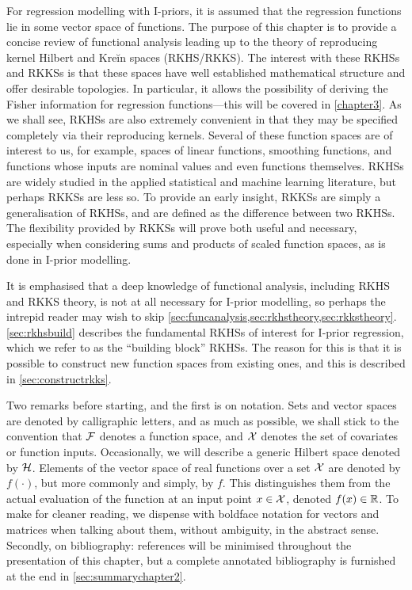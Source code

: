 \documentclass[showframe,11pt,twoside,openright]{report}
\begin{document}
\label{chapter2}
\thispagestyle{chaptertwo}

For regression modelling with I-priors, it is assumed that the regression functions lie in some vector space of functions.
The purpose of this chapter is to provide a concise review of functional analysis leading up to the theory of reproducing kernel Hilbert and Kreĭn spaces (RKHS/RKKS).
The interest with these RKHSs and RKKSs is that these spaces have well established mathematical structure and offer desirable topologies.
In particular, it allows the possibility of deriving the Fisher information for regression functions---this will be covered in \cref{chapter3}.
As we shall see, RKHSs are also extremely convenient in that they may be specified completely via their reproducing kernels.
Several of these function spaces are of interest to us, for example, spaces of linear functions, smoothing functions, and functions whose inputs are nominal values and even functions themselves.
RKHSs are widely studied in the applied statistical and machine learning literature, but perhaps RKKSs are less so.
To provide an early insight, RKKSs are simply a generalisation of RKHSs, and are defined as the difference between two RKHSs.
The flexibility provided by RKKSs will prove both useful and necessary, especially when considering sums and products of scaled function spaces, as is done in I-prior modelling.

It is emphasised that a deep knowledge of functional analysis, including RKHS and RKKS theory, is not at all necessary for I-prior modelling, so perhaps the intrepid reader may wish to skip \cref{sec:funcanalysis,sec:rkhstheory,sec:rkkstheory}. 
\cref{sec:rkhsbuild} describes the fundamental RKHSs of interest for I-prior regression, which we refer to as the ``building block'' RKHSs.
The reason for this is that it is possible to construct new function spaces from existing ones, and this is described in \cref{sec:constructrkks}.

Two remarks before starting, and the first is on notation.
Sets and vector spaces are denoted by calligraphic letters, and as much as possible, we shall stick to the convention that ${\mathcal F}$ denotes a function space, and ${\mathcal X}$ denotes the set of covariates or function inputs. 
Occasionally, we will describe a generic Hilbert space denoted by ${\mathcal H}$.
Elements of the vector space of real functions over a set ${\mathcal X}$ are denoted by $f(\cdot)$, but more commonly and simply, by $f$.
This distinguishes them from the actual evaluation of the function at an input point $x \in {\mathcal X}$, denoted $f(x) \in \mathbb{R}$.
To make for cleaner reading, we dispense with boldface notation for vectors and matrices when talking about them, without ambiguity, in the abstract sense.
Secondly, on bibliography: references will be minimised throughout the presentation of this chapter, but a complete annotated bibliography is furnished at the end in \cref{sec:summarychapter2}.
 
\end{document}
